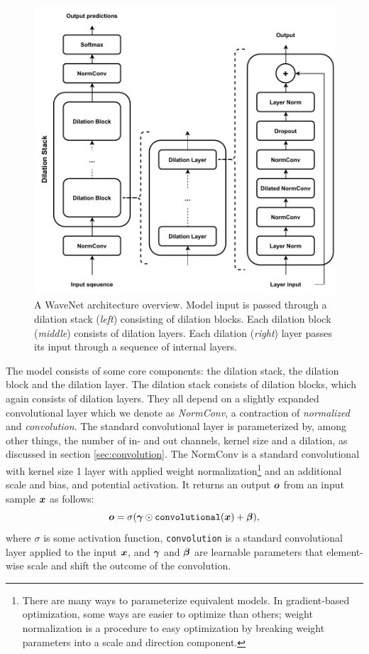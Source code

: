 \begin{figure}[H]
    \centering
    \includegraphics{report/figures/wavenet_architecture.pdf}
    \caption{A WaveNet architecture overview. Model input is passed through a dilation stack (\textit{left}) consisting of dilation blocks. Each dilation block (\textit{middle}) consists of dilation layers. Each dilation (\textit{right}) layer passes its input through a sequence of internal layers.}
    \label{fig:wavenet_architecture}
\end{figure}

The model consists of some core components: the dilation stack, the dilation block and the dilation layer. The dilation stack consists of dilation blocks, which again consists of dilation layers. They all depend on a slightly expanded convolutional layer which we denote as \textit{NormConv}, a contraction of \textit{normalized} and \textit{convolution}. The standard convolutional layer is parameterized by, among other things, the number of in- and out channels, kernel size and a dilation, as discussed in section \ref{sec:convolution}. The NormConv is a standard convolutional with kernel size 1 layer with applied weight normalization\footnote{There are many ways to parameterize equivalent models. In gradient-based optimization, some ways are easier to optimize than others; weight normalization is a procedure to easy optimization by breaking weight parameters into a scale and direction component.} \cite{salimans2016weight} and an additional scale and bias, and potential activation. It returns  an output $\bm{ o }$ from an input sample $\bm{ x }$ as follows:
\[ \bm{ o } = \sigma{\mathopen{} \left( \bm{ \gamma } \odot \texttt{convolutional}{\mathopen{} \left( \bm{ x } \right) \mathclose{}} + \bm{ \beta } \right) \mathclose{}}, \]
where $\sigma$ is some activation function, \texttt{convolution} is a standard convolutional layer applied to the input $\bm{ x }$, and $\bm{ \gamma }$ and $\bm{ \beta }$ are learnable parameters that element-wise scale and shift the outcome of the convolution.

